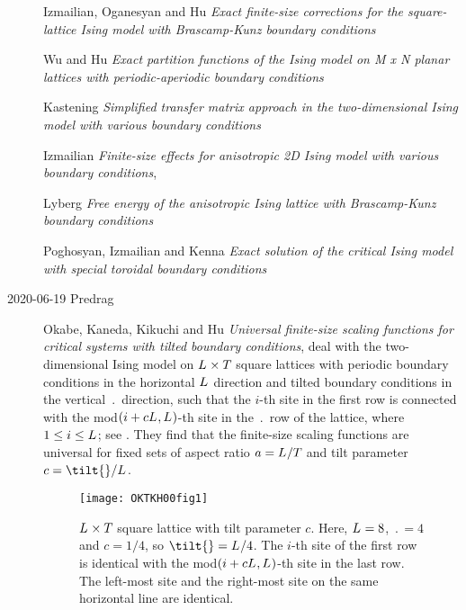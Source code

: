 \begin{description}
Izmailian, Oganesyan and Hu {\em Exact finite-size
corrections for the square-lattice {Ising} model with {Brascamp-Kunz}
boundary conditions}

Wu and Hu {\em Exact partition functions of the {Ising} model
on {M x N} planar lattices with periodic-aperiodic boundary conditions}

Kastening {\em Simplified transfer matrix approach in the
two-dimensional {Ising} model with various boundary conditions}

Izmailian {\em Finite-size effects for anisotropic {2D
Ising} model with various boundary conditions},

Lyberg {\em Free energy of the anisotropic {Ising} lattice
with {Brascamp-Kunz} boundary conditions}

Poghosyan, Izmailian and Kenna {\em Exact solution of the
critical {Ising} model with special toroidal boundary conditions}


\item[2020-06-19 Predrag]
Okabe, Kaneda, Kikuchi and Hu {\em Universal finite-size
scaling functions for critical systems with tilted boundary conditions},
deal with the two-dimensional Ising model on ${L_{}} \times
{\ensuremath{T_{}}}$ square lattices with periodic boundary conditions in the
horizontal ${L_{}}$ direction and tilted boundary conditions in the
vertical $\period{}$ direction, such that the $i$-th site in the first
row is connected with the mod$(i + c {L_{}},{L_{}})$-th site in
the $\period{}$ row of the lattice, where $1 \le i \le {\ensuremath{L_{}}}$; see
. They find that the finite-size scaling functions
are universal for fixed sets of aspect ratio $a={L_{}}/{T_{}}$ and
tilt parameter $c=\tilt{}/\speriod{}$.

\begin{figure}
  \centering
\texttt{[image: OKTKH00fig1]}
\caption{\label{OKTKH00fig1} %
 ${L_{}} \times {\ensuremath{T_{}}}$ square lattice with tilt parameter $c$.
 Here, ${L_{}}=8$, $\period{}=4$ and $c=1/4$, so
 $\tilt{}=\speriod{}/4$. The $i$-th site of the first row is identical
 with the mod$(i + c {L_{}},{L_{}})$-th site in the last row. The
 left-most site and the right-most site on the same horizontal line are
 identical.
 }
\end{figure}


\end{description}
